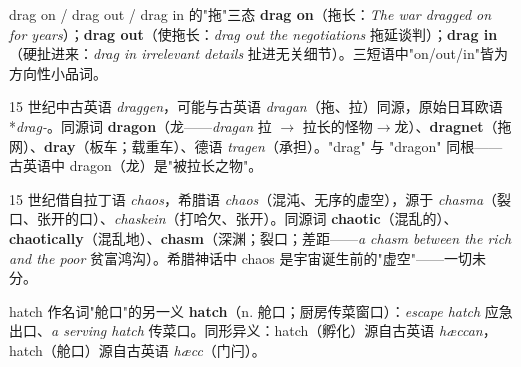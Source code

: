 \documentclass[../main.tex]{subfiles}
\begin{document}

\begin{gram}{drag on / drag out / drag in 的"拖"三态}
\textbf{drag on}（拖长：\textit{The war dragged on for years}）；\textbf{drag out}（使拖长：\textit{drag out the negotiations} 拖延谈判）；\textbf{drag in}（硬扯进来：\textit{drag in irrelevant details} 扯进无关细节）。三短语中"on/out/in"皆为方向性小品词。
\end{gram}

\begin{origin}
15 世纪中古英语 \textit{draggen}，可能与古英语 \textit{dragan}（拖、拉）同源，原始日耳欧语 *\textit{drag-}。同源词 \textbf{dragon}（龙——\textit{dragan} 拉 $\to$ 拉长的怪物$\to$龙）、\textbf{dragnet}（拖网）、\textbf{dray}（板车；载重车）、德语 \textit{tragen}（承担）。"drag" 与 "dragon" 同根——古英语中 dragon（龙）是"被拉长之物"。
\end{origin}



\begin{origin}
15 世纪借自拉丁语 \textit{chaos}，希腊语 \textit{chaos}（混沌、无序的虚空），源于 \textit{chasma}（裂口、张开的口）、\textit{chaskein}（打哈欠、张开）。同源词 \textbf{chaotic}（混乱的）、\textbf{chaotically}（混乱地）、\textbf{chasm}（深渊；裂口；差距——\textit{a chasm between the rich and the poor} 贫富鸿沟）。希腊神话中 chaos 是宇宙诞生前的"虚空"——一切未分。
\end{origin}





\begin{gram}{hatch 作名词"舱口"的另一义}
\textbf{hatch}（n. 舱口；厨房传菜窗口）：\textit{escape hatch} 应急出口、\textit{a serving hatch} 传菜口。同形异义：hatch（孵化）源自古英语 \textit{hæccan}，hatch（舱口）源自古英语 \textit{hæcc}（门闩）。
\end{gram}
\end{document}
